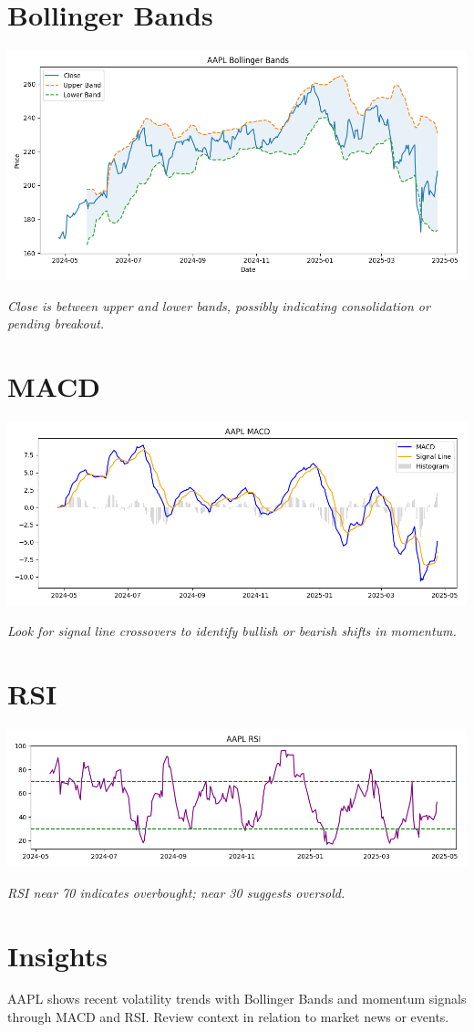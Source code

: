 \documentclass{article}
\begin{document}
\section*{Bollinger Bands}
\includegraphics[width=\textwidth]{bollinger_AAPL_2025-04-25_10-43-40.png}

\textit{Close is between upper and lower bands, possibly indicating consolidation or pending breakout.}

\section*{MACD}
\includegraphics[width=\textwidth]{macd_AAPL_2025-04-25_10-43-40.png}

\textit{Look for signal line crossovers to identify bullish or bearish shifts in momentum.}

\section*{RSI}
\includegraphics[width=\textwidth]{rsi_AAPL_2025-04-25_10-43-40.png}

\textit{RSI near 70 indicates overbought; near 30 suggests oversold.}

\section*{Insights}
AAPL shows recent volatility trends with Bollinger Bands and momentum signals through MACD and RSI. Review context in relation to market news or events.
\end{document}
